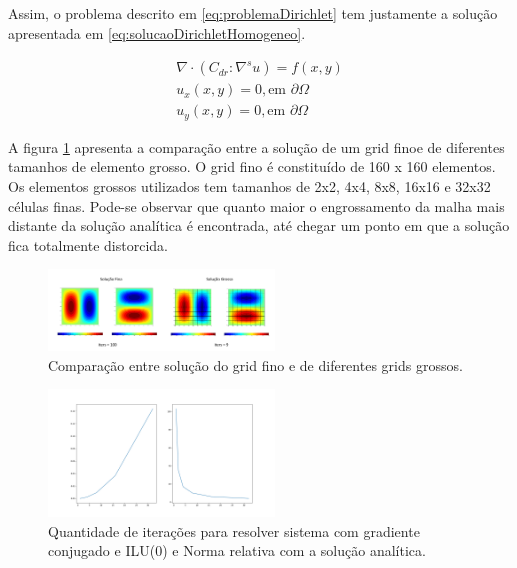 Assim, o problema descrito em \ref{eq:problemaDirichlet} tem justamente a solução apresentada em \ref{eq:solucaoDirichletHomogeneo}.

\begin{equation} \label{eq:problemaDirichlet}
\begin{matrix}
\nabla \cdot  (C_{dr} : \nabla ^s u) = f(x,y)
\\ 
u_x (x, y)  =  0, \text{em } \partial \Omega
\\ 
u_y (x, y)  =  0, \text{em } \partial \Omega

\end{matrix}
\end{equation}

A figura \ref{fig:DirichletHomogeneo} apresenta a comparação entre a solução de um grid finoe de diferentes tamanhos de elemento grosso. 
O grid fino é constituído de 160 x 160 elementos. Os elementos grossos utilizados tem tamanhos de  2x2, 4x4, 8x8, 16x16 e 32x32 células finas. 
Pode-se observar que quanto maior o engrossamento da malha mais distante da solução analítica é encontrada, até chegar um ponto em que a solução
fica totalmente distorcida. 

\begin{figure}[!htbp]
\label{fig:DirichletHomogeneo}
\centering
\includegraphics[width=6cm]{chap08/figs/DirichletHomogeneoTemp.png}
\caption{Comparação entre solução do grid fino e de diferentes grids grossos.}
\end{figure}


\begin{figure}[!htbp]
    \label{fig:graficoHomogeneo}
    \centering
    \includegraphics[width=6cm]{chap08/figs/result_analiticos.png}
    \caption{Quantidade de iterações para resolver sistema com gradiente conjugado e ILU(0) e Norma relativa com a solução analítica.}
\end{figure}


